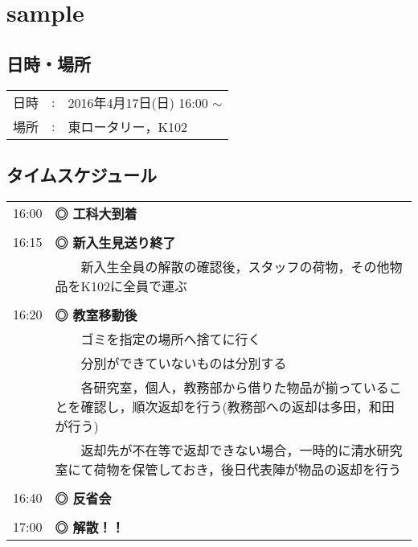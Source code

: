 \documentclass[12pt]{jarticle}
\begin{document}

\section{sample}

\subsection{日時・場所}
\begin{tabular}{p{}rp{}}
	日時 & : & 2016年4月17日(日) 16:00 $\sim$\\ 
	場所 & : & 東ロータリー，K102
\end{tabular}


\subsection{タイムスケジュール}
\begin{longtable}{p{}p{}}
	16:00 & \textbf{◎ 工科大到着} \\\\
	
	16:15 & \textbf{◎ 新入生見送り終了} \\
	& \ \ \textbullet \ \ 新入生全員の解散の確認後，スタッフの荷物，その他物品をK102に全員で運ぶ \\\\
	
	16:20 & \textbf{◎ 教室移動後} \\
	& \ \ \textbullet \ \ ゴミを指定の場所へ捨てに行く\\
	& \ \ \textbullet \ \ 分別ができていないものは分別する\\
	& \ \ \textbullet \ \ 各研究室，個人，教務部から借りた物品が揃っていることを確認し，順次返却を行う(教務部への返却は多田，和田が行う)\\
	& \ \ \textbullet \ \ 返却先が不在等で返却できない場合，一時的に清水研究室にて荷物を保管しておき，後日代表陣が物品の返却を行う\\\\
	
	16:40 & \textbf{◎ 反省会} \\\\
	
	17:00 & \textbf{◎ 解散！！} \\  
\end{longtable}
\end{document}
